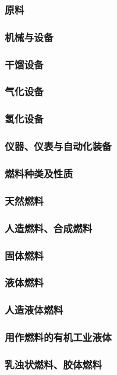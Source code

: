 \documentclass[UTF8]{../../ApplicationUniverse}
\begin{document}
\subsubsection{原料}
\subsubsection{机械与设备}
    \subsubsection{干馏设备}
    \subsubsection{气化设备}
    \subsubsection{氢化设备}
    \subsubsection{仪器、仪表与自动化装备}
\subsubsection{燃料种类及性质}
    \subsubsection{天然燃料}
    \subsubsection{人造燃料、合成燃料}
    \subsubsection{固体燃料}
    \subsubsection{液体燃料}
        \subsubsection{人造液体燃料}
        \subsubsection{用作燃料的有机工业液体}
        \subsubsection{乳浊状燃料、胶体燃料}
\end{document}

